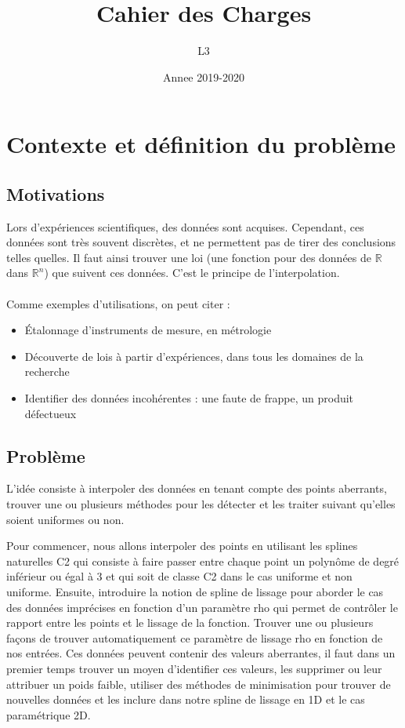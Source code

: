 \documentclass[a4paper,12pt]{article}
\title{Cahier des Charges}
\author{L3}
\date{Annee 2019-2020}
\newcommand{\IKex}[2]{\mathbb{#1}^{#2}}
\newcommand{\IK}[1]{\mathbb{#1}}
\newcommand{\IRex}[1]{\IKex{R}{#1}}
\newcommand{\IR}{\IK{R}}
\begin{document}
\maketitle
\tableofcontents

\newpage

\section{Contexte et définition du problème}

\subsection{Motivations}

Lors d'expériences scientifiques, des données sont acquises. Cependant, ces données sont très souvent discrètes, et ne permettent pas de tirer des conclusions telles quelles. Il faut ainsi trouver une loi (une fonction pour des données de $\IR$ dans $\IRex{n}$) que suivent ces données. C'est le principe de l'interpolation.
\\ \\
Comme exemples d'utilisations, on peut citer :
\begin{itemize}
\item Étalonnage d'instruments de mesure, en métrologie
\item Découverte de lois à partir d'expériences, dans tous les domaines de la recherche
\item Identifier des données incohérentes : une faute de frappe, un produit défectueux
\end{itemize}

\subsection{Problème}

L’idée consiste à interpoler des données en tenant compte des points aberrants, trouver une ou plusieurs méthodes pour les détecter et les traiter suivant qu’elles soient uniformes ou non.

Pour commencer, nous allons interpoler des points en utilisant les splines naturelles C2 qui consiste à faire passer entre chaque point un polynôme de degré inférieur ou égal à 3 et qui soit de classe C2 dans le cas uniforme et non uniforme.
Ensuite, introduire la notion de spline de lissage pour aborder le cas des données imprécises en fonction d’un paramètre rho qui permet de contrôler le rapport entre les points et le lissage de la fonction. Trouver une ou plusieurs façons de trouver automatiquement ce paramètre de lissage rho en fonction de nos entrées.
Ces données peuvent contenir des valeurs aberrantes, il faut dans un premier temps trouver un moyen d’identifier ces valeurs, les supprimer ou leur attribuer un poids faible, utiliser des méthodes de minimisation pour trouver de nouvelles données et les inclure dans notre spline de lissage en 1D et le cas paramétrique 2D.
\end{document}
